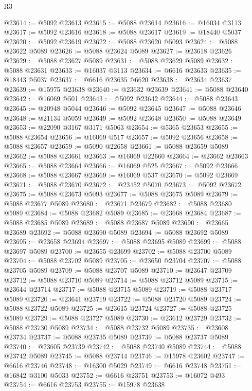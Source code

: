 \begin{lexlean}{R3}
\begin{coremodule}
@23614 := @5092 @23613
@23615 := @5088 @23614
@23616 := @16034 @3113
@23617 := @5092 @23616
@23618 := @5088 @23617
@23619 := @18440 @5037
@23620 := @5092 @23619
@23622 := @5088 @23620 @5093
@23624 := @5088 @23622 @5089
@23626 := @5088 @23624 @5089
@23627 := @23618 @23626
@23629 := @5088 @23627 @5089
@23631 := @5088 @23629 @5089
@23632 := @5088 @23631
@23633 := @16037 @3113
@23634 := @6616 @23633
@23635 := @18443 @5037
@23637 := @6616 @23635 @6620
@23638 := @23634 @23637
@23639 := @15975 @23638
@23640 := @23632 @23639
@23641 := @5088 @23640
@23642 := @16069 @501
@23643 := @5092 @23642
@23644 := @5088 @23643
@23645 := @20948 @5044
@23646 := @5092 @23645
@23647 := @5088 @23646
@23648 := @21134 @5059
@23649 := @5092 @23648
@23650 := @5088 @23649
@23653 := @22090 @3167 @3171 @5063
@23654 := @5365 @23653
@23655 := @5088 @23654
@23656 := @16069 @517
@23657 := @5092 @23656
@23658 := @5088 @23657
@23659 := @5090 @22658
@23661 := @5088 @23659 @5089
@23662 := @5088 @23661
@23663 := @16069 @22660
@23664 := @23662 @23663
@23665 := @5088 @23664
@23666 := @16069 @525
@23667 := @5092 @23666
@23668 := @5088 @23667
@23669 := @16069 @537
@23670 := @5092 @23669
@23671 := @5088 @23670
@23672 := @23452 @5070
@23673 := @5092 @23672
@23675 := @5088 @23673 @5093
@23677 := @5088 @23675 @5089
@23679 := @5088 @23677 @5089
@23680 := @23671 @23679
@23682 := @5088 @23680 @5089
@23684 := @5088 @23682 @5089
@23685 := @23668 @23684
@23687 := @5088 @23685 @5089
@23689 := @5088 @23687 @5089
@23690 := @23665 @23689
@23692 := @5088 @23690 @5089
@23694 := @5088 @23692 @5089
@23695 := @23658 @23694
@23697 := @5088 @23695 @5089
@23699 := @5088 @23697 @5089
@23700 := @23655 @23699
@23702 := @5088 @23700 @5089
@23704 := @5088 @23702 @5089
@23705 := @23650 @23704
@23707 := @5088 @23705 @5089
@23709 := @5088 @23707 @5089
@23710 := @23647 @23709
@23712 := @5088 @23710 @5089
@23714 := @5088 @23712 @5089
@23715 := @23644 @23714
@23717 := @5088 @23715 @5089
@23719 := @5088 @23717 @5089
@23720 := @23641 @23719
@23722 := @5088 @23720 @5089
@23724 := @5088 @23722 @5089
@23725 := @23615 @23724
@23727 := @5088 @23725 @5089
@23729 := @5088 @23727 @5089
@23730 := @23612 @23729
@23732 := @5088 @23730 @5089
@23734 := @5088 @23732 @5089
@23735 := @23608 @23734
@23737 := @5088 @23735 @5089
@23739 := @5088 @23737 @5089
@23740 := @23605 @23739
@23742 := @5088 @23740 @5089
@23744 := @5088 @23742 @5089
@23745 := @5088 @23744
@23746 := @15978 @23602
@23747 := @6616 @23746
@23748 := @16300 @5029
@23749 := @6616 @23748
@23751 := @16842 @3100 @5033
@23752 := @6616 @23751
@23753 := @16072 @493
@23754 := @6616 @23753
@23755 := @15978 @23638

\end{coremodule}
\end{lexlean}
